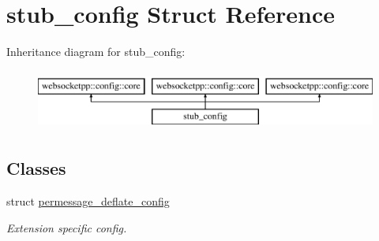 \hypertarget{structstub__config}{}\section{stub\+\_\+config Struct Reference}
\label{structstub__config}
Inheritance diagram for stub\+\_\+config\+:\begin{figure}[H]
\begin{center}
\leavevmode
\includegraphics[height=2.000000cm]{structstub__config}
\end{center}
\end{figure}
\subsection*{Classes}
\begin{DoxyCompactItemize}
\item 
struct \hyperlink{structstub__config_1_1permessage__deflate__config}{permessage\+\_\+deflate\+\_\+config}
\begin{DoxyCompactList}\small\item\em Extension specific config. \end{DoxyCompactList}\end{DoxyCompactItemize}
